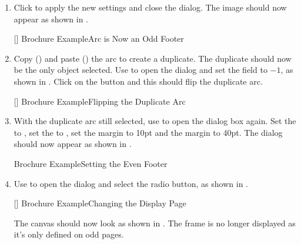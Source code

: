 \begin{enumerate}
\begin{information}
If you prefer to use the  dialog, select the
 button and the label will
automatically be filled.
\end{information}

{}
{Brochure Example\dash Setting The Odd Footer}

\item Click  to apply the new settings and close the dialog. The
image should now appear as shown in .

[]
{}
{Brochure Example\dash Arc is Now an Odd Footer}

\item Copy () and paste
() the arc to create a
duplicate. The duplicate should now be the only \gls{object}
selected. Use  to open the
 dialog and set the
 field to $-1$, as shown in
. Click on the  button and this should
flip the duplicate arc.

[]
{}
{Brochure Example\dash Flipping the Duplicate Arc}

\item With the duplicate arc still selected, use
 to open the
 dialog box again. Set the
 to , set the
 to
, set the
 margin to 10\gls{pt} and the
 margin to 40\gls*{pt}.
The dialog should now appear as shown in .

{}
{Brochure Example\dash Setting the Even Footer}

\item Use  to open the
 dialog and select the
 radio button, as shown in
.

[]
{}
{Brochure Example\dash Changing the Display Page}

The \gls{canvas} should now look as shown in
. The  frame is no longer
displayed as it's only defined on odd pages.


\end{enumerate}
